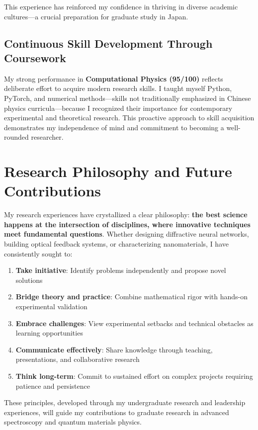 \documentclass[11pt,a4paper]{article}
\begin{document}
This experience has reinforced my confidence in thriving in diverse academic cultures—a crucial preparation for graduate study in Japan.

\subsection{Continuous Skill Development Through Coursework}

My strong performance in \textbf{Computational Physics (95/100)} reflects deliberate effort to acquire modern research skills. I taught myself Python, PyTorch, and numerical methods—skills not traditionally emphasized in Chinese physics curricula—because I recognized their importance for contemporary experimental and theoretical research. This proactive approach to skill acquisition demonstrates my independence of mind and commitment to becoming a well-rounded researcher.

\section{Research Philosophy and Future Contributions}

My research experiences have crystallized a clear philosophy: \textbf{the best science happens at the intersection of disciplines, where innovative techniques meet fundamental questions}. Whether designing diffractive neural networks, building optical feedback systems, or characterizing nanomaterials, I have consistently sought to:

\begin{enumerate}
    \item \textbf{Take initiative}: Identify problems independently and propose novel solutions
    \item \textbf{Bridge theory and practice}: Combine mathematical rigor with hands-on experimental validation
    \item \textbf{Embrace challenges}: View experimental setbacks and technical obstacles as learning opportunities
    \item \textbf{Communicate effectively}: Share knowledge through teaching, presentations, and collaborative research
    \item \textbf{Think long-term}: Commit to sustained effort on complex projects requiring patience and persistence
\end{enumerate}

These principles, developed through my undergraduate research and leadership experiences, will guide my contributions to graduate research in advanced spectroscopy and quantum materials physics.
\end{document}
